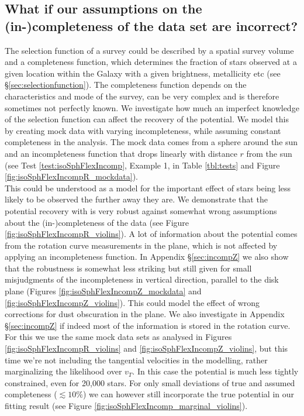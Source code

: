 \subsection{What if our assumptions on the (in-)completeness of the data set are incorrect?} \label{sec:results_incompR}

The selection function of a survey could be described by a spatial survey volume and a completeness function, which determines the fraction of stars observed at a given location within the Galaxy with a given brightness, metallicity etc (see \S\ref{sec:selectionfunction}). The completeness function depends on the characteristics and mode of the survey, can be very complex and is therefore sometimes not perfectly known. We investigate how much an imperfect knowledge of the selection function can affect the recovery of the potential. We model this by creating mock data with varying incompleteness, while assuming constant completeness in the analysis. The mock data comes from a sphere around the sun and an incompleteness function that drops linearly with distance $r$ from the sun (see Test \ref{test:isoSphFlexIncomp}, Example 1, in Table \ref{tbl:tests} and Figure \ref{fig:isoSphFlexIncompR_mockdata}).
\\This could be understood as a model for the important effect of stars being less likely to be observed the further away they are. We demonstrate that the potential recovery with \RM is very robust against somewhat wrong assumptions about the (in-)completeness of the data (see Figure \ref{fig:isoSphFlexIncompR_violins}). A lot of information about the potential comes from the rotation curve measurements in the plane, which is not affected by applying an incompleteness function. In Appendix \S\ref{sec:incompZ} we also show that the robustness is somewhat less striking but still given for small misjudgments of the incompleteness in vertical direction, parallel to the disk plane (Figures \ref{fig:isoSphFlexIncompZ_mockdata} and \ref{fig:isoSphFlexIncompZ_violins}). This could model the effect of wrong corrections for dust obscuration in the plane. We also investigate in Appendix \S\ref{sec:incompZ} if indeed most of the information is stored in the rotation curve. For this we use the same mock data sets as analysed in Figures \ref{fig:isoSphFlexIncompR_violins} and \ref{fig:isoSphFlexIncompZ_violins}, but this time we’re not including the tangential velocities in the modelling, rather marginalizing the likelihood over $v_T$. In this case the potential is much less tightly constrained, even for 20,000 stars. For only small deviations of true and assumed completeness ($\lesssim 10\%$) we can however still incorporate the true potential in our fitting result (see Figure \ref{fig:isoSphFlexIncomp_marginal_violins}). 



